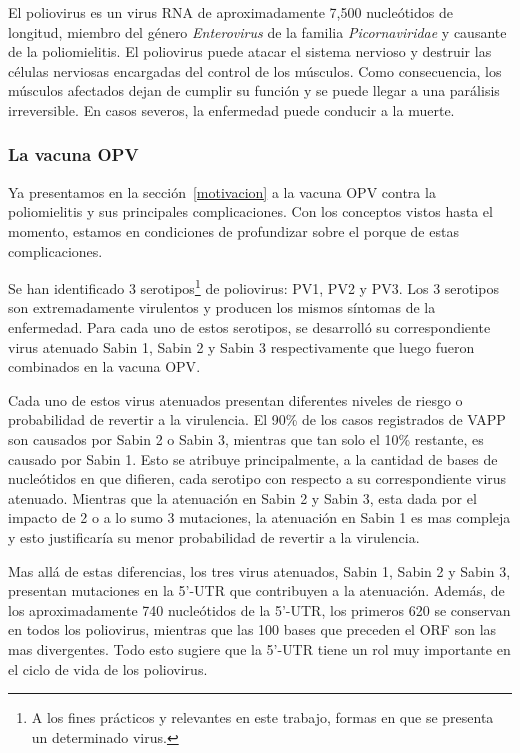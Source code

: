El poliovirus es un virus \ac{RNA} de aproximadamente 7,500 nucle\'otidos de
longitud, miembro del g\'enero \textit{Enterovirus} de la familia
\textit{Picornaviridae} y causante de la poliomielitis. El poliovirus puede
atacar el sistema nervioso y destruir las c\'elulas nerviosas encargadas del
control de los m\'usculos. Como consecuencia, los m\'usculos afectados dejan de
cumplir su funci\'on y se puede llegar a una par\'alisis irreversible. En casos
severos, la enfermedad puede conducir a la muerte.

\subsubsection{La vacuna \ac{OPV}}

Ya presentamos en la secci\'on~\ref{motivacion} a la vacuna \ac{OPV} contra la
poliomielitis y sus principales complicaciones. Con los conceptos vistos
hasta el momento, estamos en condiciones de profundizar sobre el
porque de estas complicaciones.

Se han identificado 3 serotipos\footnote{A los fines pr\'acticos y relevantes en
este trabajo, formas en que se presenta un determinado virus.} de poliovirus:
\ac{PV1}, \ac{PV2} y \ac{PV3}. Los 3 serotipos son extremadamente virulentos y
producen los mismos s\'intomas de la enfermedad. Para cada uno de estos
serotipos, se desarroll\'o  su correspondiente virus atenuado Sabin 1, Sabin 2 y
Sabin 3 respectivamente que luego fueron combinados en la vacuna \ac{OPV}.

Cada uno de estos virus atenuados presentan diferentes niveles de riesgo o
probabilidad de revertir a la virulencia. El 90\% de los casos registrados de
\ac{VAPP} son causados por Sabin 2 o Sabin 3, mientras que tan solo el 10\%
restante, es causado por Sabin 1\cite{Philip92}. Esto se atribuye
principalmente, a la cantidad de bases de nucle\'otidos en que difieren, cada
serotipo con respecto a su correspondiente virus atenuado. Mientras que la
atenuaci\'on en Sabin 2 y Sabin 3, esta dada por el impacto de 2
o a lo sumo 3 mutaciones, la atenuaci\'on en Sabin 1 es mas compleja y esto
justificar\'ia su menor probabilidad de revertir a la virulencia\cite{Philip92}.

Mas all\'a de estas diferencias, los tres virus atenuados, Sabin 1, Sabin 2 y
Sabin 3, presentan mutaciones en la 5'-\ac{UTR} que contribuyen a la
atenuaci\'on. Adem\'as, de los aproximadamente 740 nucle\'otidos de la
5'-\ac{UTR}, los primeros 620 se conservan en todos los poliovirus, mientras que
las 100 bases que preceden el \ac{ORF} son las mas divergentes. Todo esto
sugiere que la 5'-\ac{UTR} tiene un rol muy importante en el ciclo de vida de
los poliovirus\cite{Philip92}.

